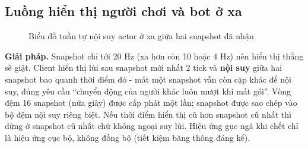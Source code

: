 \subsection{Luồng hiển thị người chơi và bot ở xa}
\begin{figure}[H]
\centering
\renewcommand{\seqstep}{0.64cm}
\caption{Biểu đồ tuần tự nội suy actor ở xa giữa hai snapshot đã nhận}
\label{fig:A-luong-noisuy}
\end{figure}

\textbf{Giải pháp.} Snapshot chỉ tới 20 Hz (xa hơn còn 10 hoặc 4 Hz) nên hiển thị thẳng sẽ giật. Client hiển thị lùi sau snapshot mới nhất 2 tick và \textbf{nội suy} giữa hai snapshot bao quanh thời điểm đó - mất một snapshot vẫn còn cặp khác để nội suy, đúng yêu cầu ``chuyển động của người khác luôn mượt khi mất gói''. Vòng đệm 16 snapshot (nửa giây) được cấp phát một lần; snapshot được sao chép vào bộ đệm nội suy riêng biệt. Nếu thời điểm hiển thị cũ hơn snapshot cũ nhất thì dừng ở snapshot cũ nhất chứ không ngoại suy lùi. Hiệu ứng gục ngã khi chết chỉ là hiệu ứng cục bộ, không đồng bộ (tiết kiệm băng thông đáng kể).

